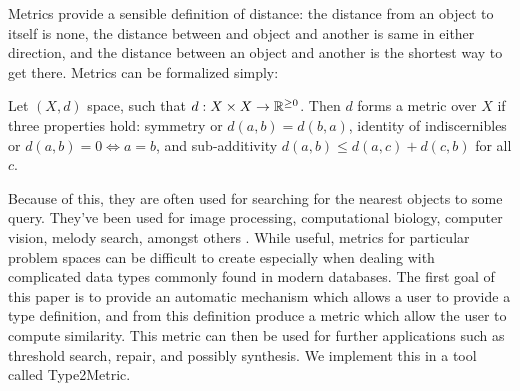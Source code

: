 Metrics provide a sensible definition of distance:
the distance from an object to itself is none,
the distance between and object and another is same in either direction,
and the distance between an object and another is the shortest way to get there.
Metrics can be formalized simply:

\begin{definition}[Metric]
Let $(X, d)$ space, such that $d: X \times X \to \mathbb{R}^{\ge 0}$. 
Then $d$ forms a metric over $X$ if three properties hold:
symmetry or $d(a, b) = d(b, a)$, identity of indiscernibles or $d(a, b) = 0 \iff a = b$,
and sub-additivity $d(a, b) \le d(a, c) + d(c, b)$ for all $c$.
\end{definition}

Because of this, they are often used for searching for the nearest objects to some query.
They've been used for image processing, computational biology, computer vision, melody search, amongst others \cite{chen}.
While useful, metrics for particular problem spaces can be difficult to create especially when dealing with complicated data types commonly found
in modern databases.
The first goal of this paper is to provide an automatic mechanism which allows a user to provide a type definition,
and from this definition produce a metric which allow the user to compute similarity.
This metric can then be used for further applications such as threshold search, repair, and possibly synthesis.
We implement this in a tool called Type2Metric.